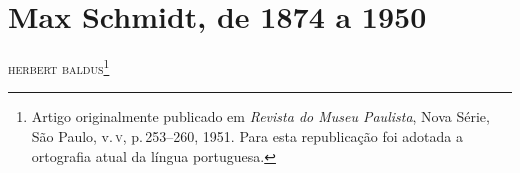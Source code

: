 






\chapter*{Max Schmidt, de 1874 a 1950}

\begin{flushright}
\textsc{herbert baldus}\footnote{Artigo originalmente publicado
  em \textit{Revista do Museu Paulista}, Nova Série, São Paulo, v.\,\textsc{v}, p.\,253--260, 1951. Para esta republicação foi adotada a ortografia atual
  da língua portuguesa.}
\end{flushright}


